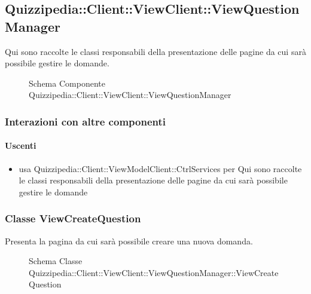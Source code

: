 \subsection{Quizzipedia::Client::ViewClient::ViewQuestionManager}
Qui sono raccolte le classi responsabili della presentazione delle pagine da cui sarà possibile gestire le domande.
\begin{figure}[H]
\centering
\noindent{}
\caption[Schema Componente Quizzipedia::Client::ViewClient::ViewQuestionManager]{Schema Componente Quizzipedia::Client::ViewClient::ViewQuestionManager}
\end{figure}
\subsubsection{Interazioni con altre componenti}
\paragraph{Uscenti}
\begin{itemize}
\item usa Quizzipedia::Client::ViewModelClient::CtrlServices per Qui sono raccolte le classi responsabili della presentazione delle pagine da cui sarà possibile gestire le domande
\end{itemize}
\subsubsection{Classe ViewCreateQuestion}
Presenta la pagina da cui sarà possibile creare una nuova domanda.
\begin{figure}[H]
\centering
\noindent{}
\caption[Schema Classe ViewCreateQuestion]{Schema Classe Quizzipedia::Client::ViewClient::ViewQuestionManager::ViewCreateQuestion}
\end{figure}
